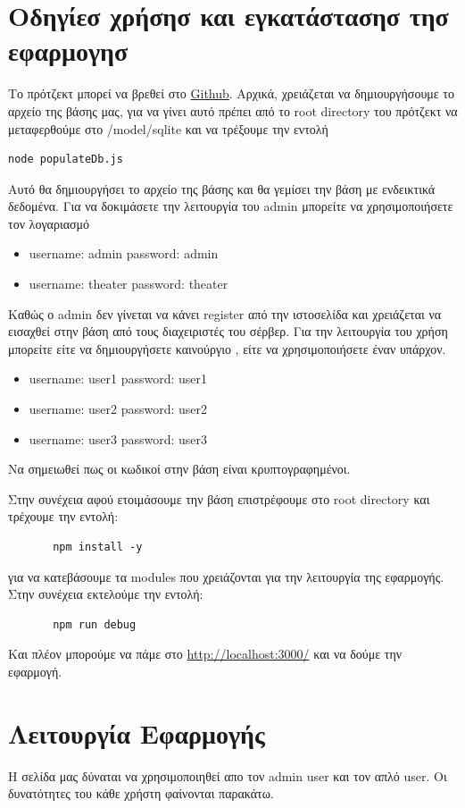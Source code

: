 \documentclass{acmart}
\begin{document}
\section{Οδηγίεσ χρήσησ και εγκατάστασησ τησ εφαρμογησ}
Το πρότζεκτ μπορεί να βρεθεί στο \href{https://github.com/KonstantoJr/web_dev_project}{Github}.
Αρχικά, χρειάζεται να δημιουργήσουμε το αρχείο της βάσης μας, για να γίνει αυτό πρέπει από το root directory
του πρότζεκτ να μεταφερθούμε στο /model/sqlite και να τρέξουμε την εντολή 
\begin{lstlisting}
node populateDb.js 
\end{lstlisting}
Αυτό θα δημιουργήσει το αρχείο της βάσης και θα γεμίσει την βάση με ενδεικτικά δεδομένα.
Για να δοκιμάσετε την λειτουργία του admin μπορείτε να χρησιμοποιήσετε τον λογαριασμό 
\begin{itemize}
       \item username: admin password: admin
       \item username: theater password: theater
\end{itemize}
Καθώς ο admin δεν γίνεται να κάνει register από την ιστοσελίδα και χρειάζεται να εισαχθεί στην βάση από τους 
διαχειριστές του σέρβερ.
Για την λειτουργία του χρήση μπορείτε είτε να δημιουργήσετε καινούργιο , είτε να χρησιμοποιήσετε έναν υπάρχον.
\begin{itemize}
       \item username: user1 password: user1
       \item username: user2 password: user2
       \item username: user3 password: user3     
\end{itemize}
Να σημειωθεί πως οι κωδικοί στην βάση είναι κρυπτογραφημένοι.

Στην συνέχεια αφού ετοιμάσουμε την βάση επιστρέφουμε στο root directory και τρέχουμε την εντολή:
\begin{lstlisting}
       npm install -y 
\end{lstlisting}
για να κατεβάσουμε τα modules που χρειάζονται για την λειτουργία της εφαρμογής.
Στην συνέχεια εκτελούμε την εντολή:
\begin{lstlisting}
       npm run debug
\end{lstlisting}
Και πλέον μπορούμε να πάμε στο \url{http://localhost:3000/} και να δούμε την εφαρμογή.


\section{Λειτουργία Εφαρμογής}
Η σελίδα μας δύναται να χρησιμοποιηθεί απο τον admin user και τον απλό user. Οι δυνατότητες του κάθε χρήστη φαίνονται παρακάτω.
\end{document}

